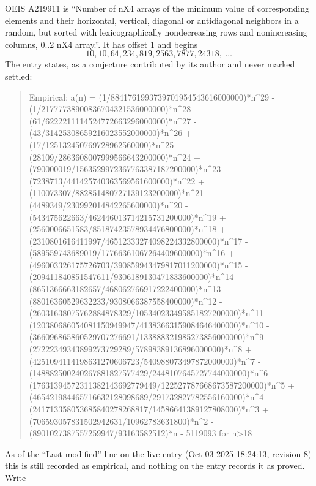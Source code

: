 \documentclass[11pt,a4paper]{article}
\theoremstyle{plain}
\theoremstyle{definition}
\begin{document}
OEIS A219911 is ``Number of nX4 arrays of the minimum value of corresponding elements and their horizontal, vertical, diagonal or antidiagonal neighbors in a random, but sorted with lexicographically nondecreasing rows and nonincreasing columns, 0..2 nX4 array.''. It has offset $1$ and begins
\[
10, 10, 64, 234, 819, 2563, 7877, 24318,\ \dots
\]
The entry states, as a conjecture contributed by its author and never marked settled:
\begin{quote}\raggedright\small
Empirical: a(n) = (1/8841761993739701954543616000000)*n\^{}29 - (1/21777738900836704321536000000)*n\^{}28 + (61/6222211114524772663296000000)*n\^{}27 - (43/31425308659216023552000000)*n\^{}26 + (17/125132450769728962560000)*n\^{}25 - (28109/2863608007999566643200000)*n\^{}24 + (790000019/1563529972367763387187200000)*n\^{}23 - (7238713/441425740363569561600000)*n\^{}22 + (110073307/882851480727139123200000)*n\^{}21 + (4489349/230992014842265600000)*n\^{}20 - (543475622663/462446013714215731200000)*n\^{}19 + (2560006651583/85187423578934476800000)*n\^{}18 + (2310801616411997/46512333274098224332800000)*n\^{}17 - (589559743689019/17766361067264409600000)*n\^{}16 + (496003326175726703/390859943479817011200000)*n\^{}15 - (209411840851547611/9306189130471833600000)*n\^{}14 + (8651366663182657/468062766917222400000)*n\^{}13 + (88016360529632233/9308066387558400000)*n\^{}12 - (26031638075762884878329/105340233495851827200000)*n\^{}11 + (120380686054081150949947/41383663159084646400000)*n\^{}10 - (366096865860529707276691/133888321985273856000000)*n\^{}9 - (27222349343899273729289/57898389136896000000)*n\^{}8 + (4251094114198631270606723/540988073497872000000)*n\^{}7 - (148882500240267881827577429/2448107645727744000000)*n\^{}6 + (17631394572311382143692779449/122527787668673587200000)*n\^{}5 + (465421984465716632128098689/291732827782556160000)*n\^{}4 - (241713358053685840278268817/14586641389127808000)*n\^{}3 + (706593057831502942631/10962783631800)*n\^{}2 - (8901027387557259947/93163582512)*n - 5119093 for n>18
\end{quote}
As of the ``Last modified'' line on the live entry (Oct 03 2025 18:24:13, revision 8) this is still
recorded as empirical, and nothing on the entry records it as proved. Write
\end{document}
